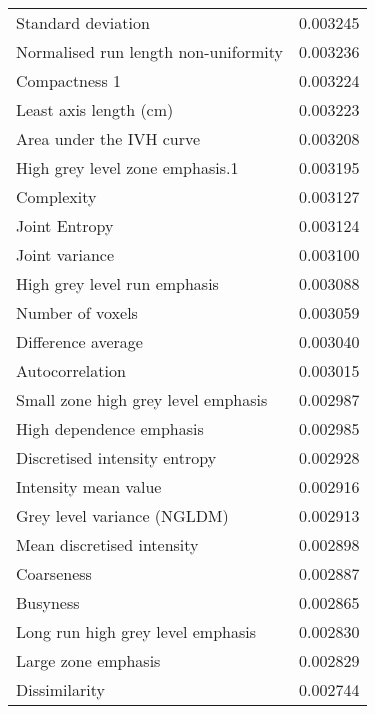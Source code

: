 \begin{longtable}{|lr|}
Standard deviation                                 &        0.003245 \\
Normalised run length non-uniformity               &        0.003236 \\
Compactness 1                                      &        0.003224 \\
Least axis length (cm)                             &        0.003223 \\
Area under the IVH curve                           &        0.003208 \\
High grey level zone emphasis.1                    &        0.003195 \\
Complexity                                         &        0.003127 \\
Joint Entropy                                      &        0.003124 \\
Joint variance                                     &        0.003100 \\
High grey level run emphasis                       &        0.003088 \\
Number of voxels                                   &        0.003059 \\
Difference average                                 &        0.003040 \\
Autocorrelation                                    &        0.003015 \\
Small zone high grey level emphasis                &        0.002987 \\
High dependence emphasis                           &        0.002985 \\
Discretised intensity entropy                      &        0.002928 \\
Intensity mean value                               &        0.002916 \\
Grey level variance (NGLDM)                        &        0.002913 \\
Mean discretised intensity                         &        0.002898 \\
Coarseness                                         &        0.002887 \\
Busyness                                           &        0.002865 \\
Long run high grey level emphasis                  &        0.002830 \\
Large zone emphasis                                &        0.002829 \\
Dissimilarity                                      &        0.002744 \\

\end{longtable}

